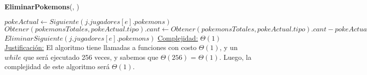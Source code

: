 \begin{algorithm}[H]{\textbf{EliminarPokemons}(, )}  
    \begin{algorithmic}[1]
            \State $pokeActual \gets Siguiente(j.jugadores[e].pokemons)$
            \State $Obtener(pokemonsTotales, pokeActual.tipo).cant \gets Obtener(pokemonsTotales, pokeActual.tipo).cant - pokeActual.cant$
            \State $EliminarSiguiente(j.jugadores[e].pokemons)$
        \EndWhile
        \medskip
        \Statex \underline{Complejidad:} $\Theta(1)$
        \Statex \underline{Justificación:}  El algoritmo tiene llamadas a funciones con costo $\Theta(1)$, y un $while$ que será ejecutado 256 veces, y sabemos que $\Theta (256)$ = $\Theta (1)$. Luego, la complejidad de este algoritmo será $\Theta (1)$.
    \end{algorithmic}
\end{algorithm} 
